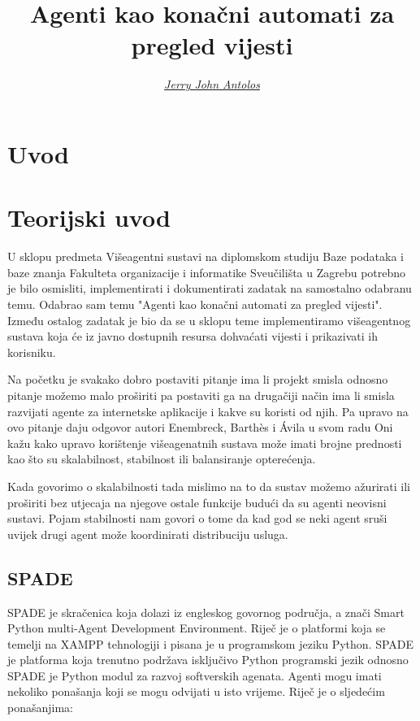 \documentclass[]{foi} %
\title{Agenti kao konačni automati za pregled vijesti}
\author{{\href{https://github.com/jantolos/MASproject_2022}{\textit{\underline{Jerry John Antolos}}}}} %
\begin{document}
\maketitle

\tableofcontents

\makeatletter {} \makeatother
\pagestyle{plain}



\chapter{Uvod}

\chapter{Teorijski uvod}
U sklopu predmeta Višeagentni sustavi na diplomskom studiju Baze podataka i baze znanja Fakulteta organizacije i informatike Sveučilišta u Zagrebu potrebno je bilo osmisliti, implementirati i dokumentirati zadatak na samostalno odabranu temu. Odabrao sam temu "Agenti kao konačni automati za pregled vijesti". Između ostalog zadatak je bio da se u sklopu teme implementiramo višeagentnog sustava koja će iz javno dostupnih resursa dohvaćati vijesti i prikazivati ih korisniku.

Na početku je svakako dobro postaviti pitanje ima li projekt smisla odnosno pitanje možemo malo proširiti pa postaviti ga na drugačiji način ima li smisla razvijati agente za internetske aplikacije i kakve su koristi od njih. Pa upravo na ovo pitanje daju odgovor autori Enembreck, Barthès i Ávila u svom radu \cite{10.1007/978-3-540-30104-2_7} Oni kažu kako upravo korištenje višeagenatnih sustava može imati brojne prednosti kao što su skalabilnost, stabilnost ili balansiranje opterećenja.

Kada govorimo o skalabilnosti tada mislimo na to da sustav možemo ažurirati ili proširiti bez utjecaja na njegove ostale funkcije budući da su agenti neovisni sustavi. Pojam stabilnosti nam govori o tome da kad god se neki agent sruši uvijek drugi agent može koordinirati distribuciju usluga.

\section{SPADE}

SPADE je skračenica koja dolazi iz engleskog govornog područja, a znači Smart Python multi-Agent Development Environment. Riječ je o platformi koja se temelji na XAMPP tehnologiji i pisana je u programskom jeziku Python. SPADE je platforma koja trenutno podržava isključivo Python programski jezik odnosno SPADE je Python modul za razvoj softverskih agenata. \cite{Spade}
Agenti mogu imati nekoliko ponašanja koji se mogu odvijati u isto vrijeme. Riječ je o sljedećim ponašanjima:
\end{document}
